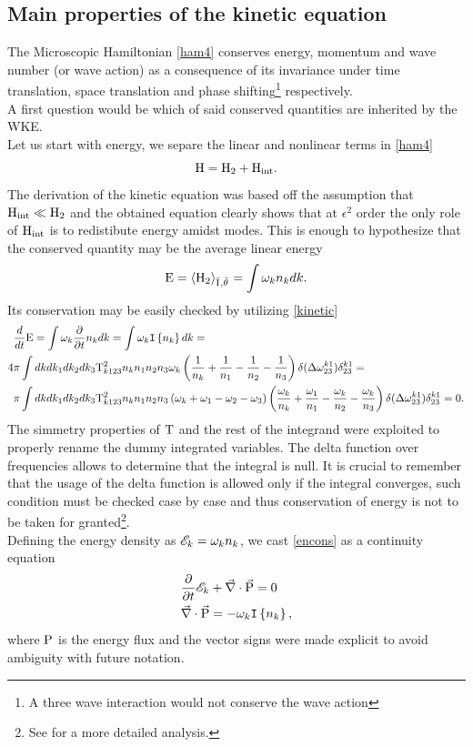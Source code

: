 \subsection{Main properties of the kinetic equation}
The Microscopic Hamiltonian \eqref{ham4} conserves energy, momentum and wave number (or wave action) as a consequence of its invariance under time translation,
space translation and phase shifting\footnote{A three wave interaction would not conserve the wave action} respectively. \\
A first question would be which of said conserved quantities are inherited by the WKE.\\
Let us start with energy, we separe the linear and nonlinear terms in \eqref{ham4}
\begin{equation}
    \mathrm{H} = \mathrm{H}_2 + \mathrm{H}_{\text{int}}.
\end{equation}
The derivation of the kinetic equation was based off the assumption that $\mathrm{H}_{\text{int}} \ll \mathrm{H}_{2}$ and the obtained equation clearly shows that at $\epsilon^2$ 
order the only role of $\mathrm{H}_{\text{int}}$ is to redistibute energy amidst modes. This is enough to hypothesize that the conserved quantity may be the average linear energy
\begin{equation}
    \mathrm{E} = \left\langle \mathrm{H}_2 \right\rangle_{\bar{\mathrm{I}^{}},\bar{\theta}^{}} = \int \omega_k n_k dk.
\end{equation}
Its conservation may be easily checked by utilizing \eqref{kinetic} 
\begin{align}
    &\frac{d}{dt} \mathrm{E} = \int \omega_k \frac{\partial}{\partial t} n_k dk = \int \omega_k \mathtt{I}\left\{n_k\right\} dk = \label{encons}\\
    4 &\pi\int  dk dk_1 dk_2 dk_3 
    \mathrm{T}^2_{k123}n_kn_1n_2n_3 \omega_k
    \left(\frac{1}{n_k} + \frac{1}{n_1} - \frac{1}{n_2}- \frac{1}{n_3}  \right)
    \delta(\Delta{\omega}^{k1}_{23})\delta^{k1}_{23} = \\
    &\pi\int  dk dk_1 dk_2 dk_3 
    \mathrm{T}^2_{k123}n_kn_1n_2n_3\left(\omega_k + \omega_1 - \omega_2 - \omega_3\right)
    \left(\frac{\omega_k}{n_k} + \frac{\omega_1}{n_1} - \frac{\omega_k}{n_2}- \frac{\omega_k}{n_3}  \right)
    \delta(\Delta{\omega}^{k1}_{23})\delta^{k1}_{23} = 0.    
\end{align}
The simmetry properties of $\mathrm{T}$ and the rest of the integrand were exploited to properly rename the dummy integrated variables. The delta function over frequencies 
allows to determine that the integral is null. It is crucial to remember that the usage of the delta function is allowed only if the integral converges, such condition
must be checked case by case and thus conservation of energy is not to be taken for granted\footnote{See \cite{Zakharov} for a more detailed analysis.}. \\
Defining the energy density as $\mathscr{E}_k = \omega_k n_k$, we cast \eqref{encons} as a continuity equation
\begin{align}
    &\frac{\partial}{\partial t} \mathscr{E}_k + \vec{\nabla}\cdot\vec{\mathrm{P}} = 0 \label{Econtinuity}\\
    &\vec{\nabla}\cdot\vec{\mathrm{P}} = -\omega_k \mathtt{I}\left\{n_k\right\}, 
\end{align}
where $\mathrm{P}$ is the energy flux and the vector signs were made explicit to avoid ambiguity with future notation. \\

